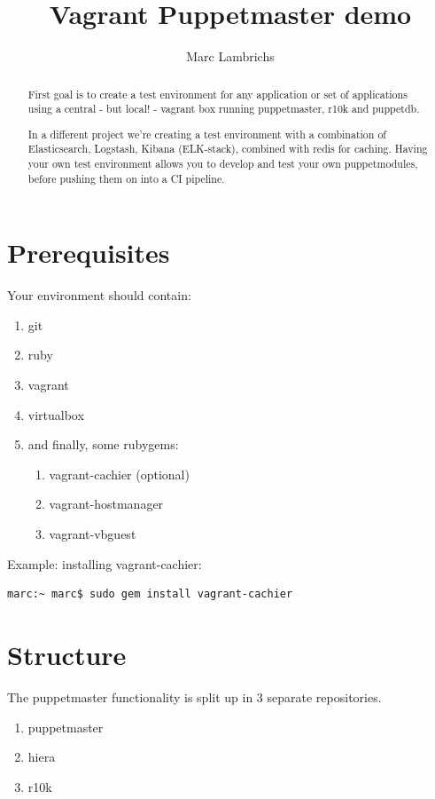 \documentclass{article}
\begin{document}
\title{Vagrant Puppetmaster demo}
\author{Marc Lambrichs}

\maketitle

\begin{abstract}
First goal is to create a test environment for any application or set of applications using a central - but local! - vagrant box running puppetmaster, r10k and puppetdb.

In a different project we're creating a test environment with a combination of Elasticsearch, Logstash, Kibana (ELK-stack), combined with redis for caching. Having your own test environment allows you to develop and test your own puppetmodules, before pushing them on into a CI pipeline.
\end{abstract}

\section{Prerequisites}
Your environment should contain:
\begin{enumerate}
\item git
\item ruby
\item vagrant
\item virtualbox
\item and finally, some rubygems:
\begin{enumerate}
\item vagrant-cachier (optional)
\item vagrant-hostmanager
\item vagrant-vbguest
\end{enumerate}
\end{enumerate}
Example: installing vagrant-cachier:

\begin{verbatim}
marc:~ marc$ sudo gem install vagrant-cachier
\end{verbatim}

\section{Structure}
The puppetmaster functionality is split up in 3 separate repositories.
\begin{enumerate}
\item puppetmaster
\item hiera
\item r10k
\end{enumerate}
\end{document}
